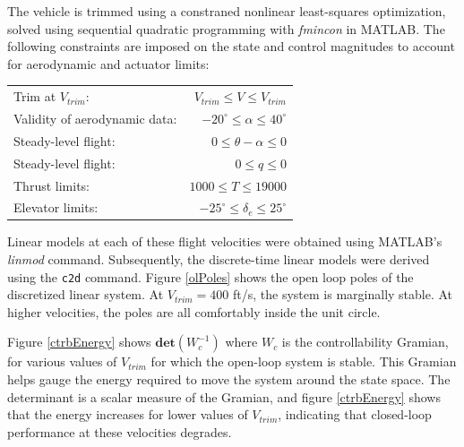 \documentclass[letterpaper, 10 pt, conference]{ieeeconf}  %
\begin{document}
The vehicle is trimmed using a constraned nonlinear least-squares optimization, solved using sequential quadratic programming with \textit{fmincon} in MATLAB. The following constraints are imposed on the state and control magnitudes to account for aerodynamic and actuator limits:

\begin{center}
  \begin{tabular}{l r}
    Trim at $V_{trim}$: & $V_{trim} \leq V \leq V_{trim}$ \\
    Validity of aerodynamic data: & $-20^{\circ} \leq \alpha \leq 40^{\circ}$ \\
    Steady-level flight: & $0 \leq \theta - \alpha \leq 0$\\
    Steady-level flight: & $0 \leq q \leq 0$\\
    Thrust limits: & $1000 \leq T \leq 19000$ \\
    Elevator limits: & $-25^{\circ} \leq \delta_e \leq 25^{\circ}$\\
  \end{tabular}
\end{center}





Linear models at each of these flight velocities were obtained using MATLAB's \textit{linmod} command. Subsequently, the discrete-time linear models were derived using the \texttt{c2d} command. Figure \ref{olPoles} shows the open loop poles of the discretized linear system. At $V_{trim} = 400$ ft/s, the system is marginally stable. At higher velocities, the poles are all comfortably inside the unit circle.

Figure \ref{ctrbEnergy} shows $\textbf{det}(W_c^{-1})$ where $W_c$ is the controllability Gramian, for various values of $V_{trim}$ for which the open-loop system is stable. This Gramian helps gauge the energy required to move the system around the state space. The determinant is a scalar measure of the Gramian, and figure \ref{ctrbEnergy}  shows that the energy increases for lower values of $V_{trim}$, indicating that closed-loop performance at these velocities degrades.
\end{document}
